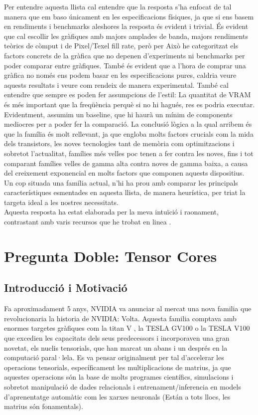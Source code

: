 \documentclass[12pt]{article}
\begin{document}
Per entendre aquesta llista cal entendre que la resposta s'ha enfocat de tal manera que em baso únicament en les especificacions físiques, ja que si ens basem en rendiments i benchmarks aleshores la resposta és evident i trivial. És evident que cal escollir les gràfiques amb majors amplades de banda, majors rendiments teòrics de còmput i de Pixel/Texel fill rate, però per Això he categoritzat els factors concrets de la gràfica que no depenen d'experiments ni benchmarks per poder comparar entre gràfiques. També és evident que a l'hora de comprar una gràfica no només ens podem basar en les especificacions pures, caldria veure aquests resultats i veure com rendeix de manera experimental. També cal entendre que sempre es poden fer assumpcions de l'estil: La quantitat de VRAM és més important que la freqüència perquè si no hi hagués, res es podria executar. Evidentment, assumim un baseline, que hi haurà un mínim de components mediocres per a poder fer la comparació. La conclusió lògica a la qual arribem és que la família és molt rellevant, ja que engloba molts factors crucials com la mida dels transistors, les noves tecnologies tant de memòria com optimitzacions i sobretot l'actualitat, famílies més velles poc tenen a fer contra les noves, fins i tot comparant famílies velles de gamma alta contra noves de gamma baixa, a causa del creixement exponencial en molts factors que componen aquests dispositius. Un cop situada una família actual, n'hi ha prou amb comparar les principals característiques esmentades en aquesta llista, de manera heurística, per triat la targeta ideal a les nostres necessitats. 
\\ 

Aquesta resposta ha estat elaborada per la meva intuïció i raonament, contrastant amb varis recursos que he trobat en linea \cite{binarytides_graphics_card_specs}\cite{logical_increments_gpu_specs}.

\section{Pregunta Doble: Tensor Cores}

\subsection{Introducció i Motivació}
Fa aproximadament 5 anys, NVIDIA va anunciar al mercat una nova familia que revolucionaria la historia de NVIDIA: Volta. Aquesta familia comptava amb enormes targetes gràfiques com la titan V , la TESLA GV100 o la TESLA V100 que excedien les capacitats dels seus predecessors i incorporaven una gran novetat, 
els nuclis tensorials, que han marcat un abans i un després en la computació paral·lela. Es va pensar originalment per tal d'accelerar les operacions tensorials, específicament les multiplicacions de matrius, ja que aquestes operacions són la base de molts programes científics, simulacions 
i sobretot manipulació de dades relacionals i entrenament/inferencia en models d'aprenentatge automàtic com les xarxes neuronals (Están a tots llocs, les matrius són fonamentals). 
\\
\end{document}
